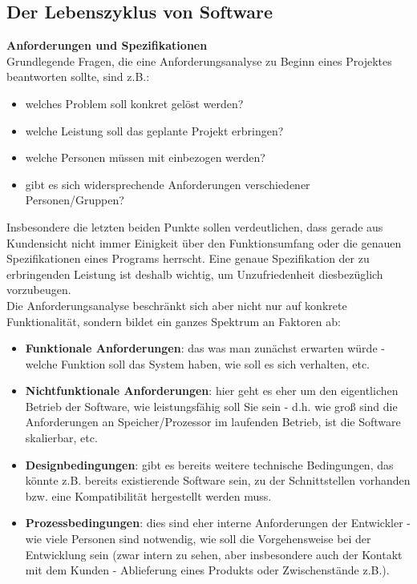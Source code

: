 \documentclass{article}
\begin{document}
\subsection{Der Lebenszyklus von Software}
\textbf{Anforderungen und Spezifikationen} \\
Grundlegende Fragen, die eine Anforderungsanalyse zu Beginn eines Projektes beantworten sollte, sind z.B.:
\begin{itemize}
    \item welches Problem soll konkret gelöst werden?
    \item welche Leistung soll das geplante Projekt erbringen?
    \item welche Personen müssen mit einbezogen werden?
    \item gibt es sich widersprechende Anforderungen verschiedener Personen/Gruppen?
\end{itemize}
Insbesondere die letzten beiden Punkte sollen verdeutlichen, dass gerade aus Kundensicht nicht immer Einigkeit über den Funktionsumfang oder die genauen Spezifikationen eines Programs herrscht. Eine genaue Spezifikation der zu erbringenden Leistung ist deshalb wichtig, um Unzufriedenheit diesbezüglich vorzubeugen. \\
Die Anforderungsanalyse beschränkt sich aber nicht nur auf konkrete Funktionalität, sondern bildet ein ganzes Spektrum an Faktoren ab:
\begin{itemize}
    \item \textbf{Funktionale Anforderungen}: das was man zunächst erwarten würde - welche Funktion soll das System haben, wie soll es sich verhalten, etc. 
    \item \textbf{Nichtfunktionale Anforderungen}: hier geht es eher um den eigentlichen Betrieb der Software, wie leistungsfähig soll Sie sein - d.h. wie groß sind die Anforderungen an Speicher/Prozessor im laufenden Betrieb, ist die Software skalierbar, etc. 
    \item \textbf{Designbedingungen}: gibt es bereits weitere technische Bedingungen, das könnte z.B. bereits existierende Software sein, zu der Schnittstellen vorhanden bzw. eine Kompatibilität hergestellt werden muss. 
    \item \textbf{Prozessbedingungen}: dies sind eher interne Anforderungen der Entwickler - wie viele Personen sind notwendig, wie soll die Vorgehensweise bei der Entwicklung sein (zwar intern zu sehen, aber insbesondere auch der Kontakt mit dem Kunden - Ablieferung eines  Produkts oder Zwischenstände z.B.). 
\end{itemize}
\end{document}

